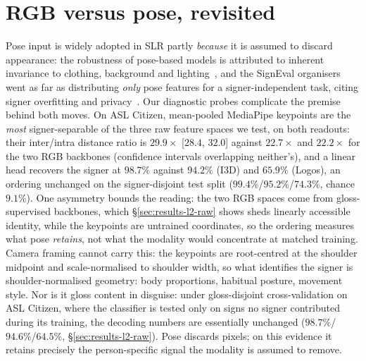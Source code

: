 \section{RGB versus pose, revisited}
\label{sec:discussion-rgb-pose}
Pose input is widely adopted in SLR partly \emph{because} it is assumed
to discard appearance: the robustness of pose-based models is
attributed to inherent invariance to clothing, background and
lighting~\cite{moryossefEvaluatingImmediateApplicability2021,
kratimenosIndependentSignLanguage2020, tranRegionAwarePoseModeling2025},
and the SignEval organisers went as far as distributing
\emph{only} pose features for a signer-independent task, citing signer
overfitting and privacy~\cite{luqmanSignEval2025Challenge2025a,
alyamiIsharahLargeScaleMultiScene2026b}. %
Our diagnostic probes complicate the premise behind both moves. On ASL
Citizen, mean-pooled MediaPipe keypoints are the \emph{most}
signer-separable of the three raw feature spaces we test, on both
readouts: their inter/intra distance ratio is
$29.9\times$ [$28.4$, $32.0$] %
against
$22.7\times$ and $22.2\times$ %
for the two RGB backbones (confidence intervals overlapping
neither's), %
and a linear head recovers the signer at
$98.7\%$ %
against $94.2\%$ (I3D) and $65.9\%$ (Logos), an ordering unchanged on
the signer-disjoint test split
($99.4\%$/$95.2\%$/$74.3\%$, chance $9.1\%$). %
One asymmetry bounds the reading: the two RGB spaces come from
gloss-supervised backbones, which \S\ref{sec:results-l2-raw} shows sheds
linearly accessible identity, while the keypoints are untrained
coordinates, so the ordering measures what pose \emph{retains}, not what
the modality would concentrate at matched training.
Camera framing cannot carry this: the keypoints are root-centred at the
shoulder midpoint and scale-normalised to shoulder width, so what
identifies the signer is shoulder-normalised geometry: body
proportions, habitual posture, movement style. %
Nor is it gloss content in disguise: under gloss-disjoint
cross-validation on ASL Citizen, where the classifier is tested only on
signs no signer contributed during its training, the decoding numbers
are essentially unchanged ($98.7\%$/$94.6\%$/$64.5\%$,
\S\ref{sec:results-l2-raw}).
Pose discards pixels; on this evidence it retains precisely the
person-specific signal the modality is assumed to remove.

